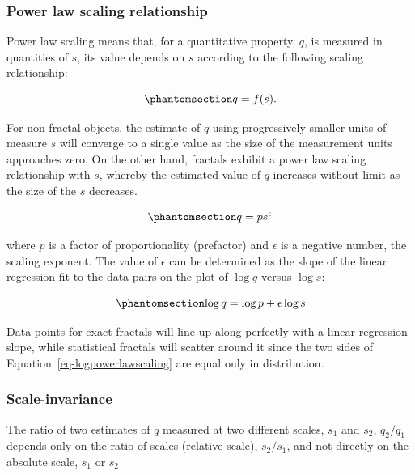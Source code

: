 \documentclass[
  sn-vancouver,
  Numbered,
  referee,
  lineno]{sn-jnl}
\begin{document}
\subsubsection{Power law scaling
relationship}\label{power-law-scaling-relationship}

Power law scaling means that, for a quantitative property, \(q\), is
measured in quantities of \(s\), its value depends on \(s\) according to
the following scaling relationship:

\begin{equation}\phantomsection\label{eq-qfs}{
q=f(s).
}\end{equation}

For non-fractal objects, the estimate of \(q\) using progressively
smaller units of measure \(s\) will converge to a single value as the
size of the measurement units approaches zero. On the other hand,
fractals exhibit a power law scaling relationship with \(s\), whereby
the estimated value of \(q\) increases without limit as the size of the
\(s\) decreases.

\begin{equation}\phantomsection\label{eq-powerlawscalingrelationship}{
q=ps^{\epsilon}
}\end{equation}

where \(p\) is a factor of proportionality (prefactor) and \(\epsilon\)
is a negative number, the scaling exponent. The value of \(\epsilon\)
can be determined as the slope of the linear regression fit to the data
pairs on the plot of \(\log{q}\) versus \(\log{s}\):

\begin{equation}\phantomsection\label{eq-logpowerlawscaling}{
\log{q} = \log{p} + \epsilon\log{s}
}\end{equation}

Data points for exact fractals will line up along perfectly with a
linear-regression slope, while statistical fractals will scatter around
it since the two sides of Equation~\ref{eq-logpowerlawscaling} are equal
only in distribution.

\subsubsection{Scale-invariance}\label{scale-invariance}

The ratio of two estimates of \(q\) measured at two different scales,
\(s_{1}\) and \(s_{2}\), \(q_{2}/q_{1}\) depends only on the ratio of
scales (relative scale), \(s_{2}/s_{1}\), and not directly on the
absolute scale, \(s_{1}\) or \(s_{2}\)
\end{document}
